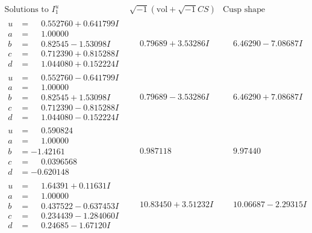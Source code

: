 \documentclass[1p]{elsarticle_modified}
\theoremstyle{definition}
\newcommand{\I}{\sqrt{-1}}
\begin{document}
$$\begin{array}{c|c|c}  
\text{Solutions to }I^u_{1}& \I (\text{vol} + \sqrt{-1}CS) & \text{Cusp shape}\\
 \hline 
\begin{aligned}
u &= \phantom{-}0.552760 + 0.641799 I \\
a &= \phantom{-}1.00000\phantom{ +0.000000I} \\
b &= \phantom{-}0.82545 - 1.53098 I \\
c &= \phantom{-}0.712390 + 0.815288 I \\
d &= \phantom{-}1.044080 + 0.152224 I\end{aligned}
 & \phantom{-}0.79689 + 3.53286 I & \phantom{-}6.46290 - 7.08687 I \\ \hline\begin{aligned}
u &= \phantom{-}0.552760 - 0.641799 I \\
a &= \phantom{-}1.00000\phantom{ +0.000000I} \\
b &= \phantom{-}0.82545 + 1.53098 I \\
c &= \phantom{-}0.712390 - 0.815288 I \\
d &= \phantom{-}1.044080 - 0.152224 I\end{aligned}
 & \phantom{-}0.79689 - 3.53286 I & \phantom{-}6.46290 + 7.08687 I \\ \hline\begin{aligned}
u &= \phantom{-}0.590824\phantom{ +0.000000I} \\
a &= \phantom{-}1.00000\phantom{ +0.000000I} \\
b &= -1.42161\phantom{ +0.000000I} \\
c &= \phantom{-}0.0396568\phantom{ +0.000000I} \\
d &= -0.620148\phantom{ +0.000000I}\end{aligned}
 & \phantom{-}0.987118\phantom{ +0.000000I} & \phantom{-}9.97440\phantom{ +0.000000I} \\ \hline\begin{aligned}
u &= \phantom{-}1.64391 + 0.11631 I \\
a &= \phantom{-}1.00000\phantom{ +0.000000I} \\
b &= \phantom{-}0.437522 - 0.637453 I \\
c &= \phantom{-}0.234439 - 1.284060 I \\
d &= \phantom{-}0.24685 - 1.67120 I\end{aligned}
 & \phantom{-}10.83450 + 3.51232 I & \phantom{-}10.06687 - 2.29315 I \\ \hline\begin{aligned}

\end{aligned}
\end{array}$$
\end{document}
